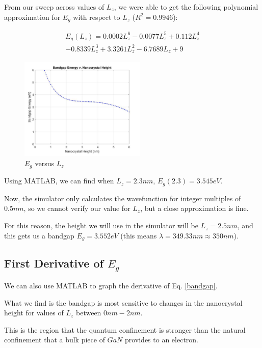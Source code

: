 \documentclass{IEEEtran}
\begin{document}
From our sweep across values of \(L_z\), we were able to get the following polynomial approximation for \(E_g\) with respect to \(L_z\) (\(R^2 = 0.9946\)):

\begin{multline} \label{bandgap}
    E_g(L_z) = 0.0002 L_z^6 - 0.0077 L_z^5 + 0.112 L_z^4 \\ - 0.8339 L_z^3 + 3.3261 L_z^2 - 6.7689 L_z + 9
\end{multline}

\begin{figure}[!h] 
    \centering
    \includegraphics*[width = 6cm]{EgVLz.png}
    \caption{\(E_g\) versus \(L_z\)}
    \label{fig:func}
\end{figure}    

Using MATLAB, we can find when \(L_z = 2.3nm\), \(E_g(2.3) = 3.545eV\).

Now, the simulator only calculates the wavefunction for integer multiples of \(0.5nm\), so we cannot verify our value for \(L_z\), but a close approximation is fine. 

For this reason, the height we will use in the simulator will be \(L_z = 2.5nm\), and this gets us a bandgap \(E_g = 3.552eV\) (this means \(\lambda = 349.33nm \approx 350nm\)).


\subsection{First Derivative of \(E_g\)}

We can also use MATLAB to graph the derivative of Eq. \ref{bandgap}. 

What we find is the bandgap is most sensitive to changes in the nanocrystal height for values of \(L_z\) between \(0nm - 2nm\).

This is the region that the quantum confinement is stronger than the natural confinement that a bulk piece of \(GaN\) provides to an electron. 
\end{document}
